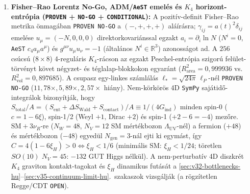 \documentclass[11pt,a4paper]{article}
\begin{document}
\begin{enumerate}
\item \textbf{Fisher--Rao Lorentz No-Go, ADM/\texttt{AeST} emelés és $K_4$ horizont-entrópia (\texttt{PROVEN} + \texttt{NO-GO} + \texttt{CONDITIONAL}):} A pozitív-definit Fisher--Rao metrika önmagában \texttt{PROVEN NO-GO} a $(-,+,+,+)$ aláírásra; $\gamma_{ij}=a(t)^2\delta_{ij}$ emelése $u_\mu=(-N,0,0,0)$ direktorkovariánssal egzakt $a_i=\partial_i\ln N$ ($N^i=0$, \texttt{AeST} $c_4 a_\mu a^\mu$) és $g^{\mu\nu}u_\mu u_\nu=-1$ (általános $N^i\in\mathbb{R}^3$) azonosságot ad. A $256$ csúcsú ($8\times 8$) 4-reguláris $K_4$-rácson az egzakt Peschel-entrópia szigorú felület-törvényt követ négyzet- és téglalap-blokkokon egyaránt ($R^2_{\mathrm{area}}=0{,}999936$ vs.\ $R^2_{\mathrm{vol}}=0{,}897685$). A csupasz egy-linkes számlálás $\ell_*=\sqrt{24\pi}\,\ell_P$-nél \texttt{PROVEN NO-GO} ($11{,}78\times, 5{,}89\times, 2{,}57\times$ hiány). Nem-körkörös 4D \texttt{SymPy} sajátidő-integrálok bizonyítják, hogy $S_{\mathrm{total}}/A = (S_{\mathrm{ent}}+\Delta S_{\mathrm{Wald}}+S_{\mathrm{contact}})/A \equiv 1/(4G_{\mathrm{ind}})$ minden spin-0 ($c=1-6\xi$), spin-1/2 (Weyl $+1$, Dirac $+2$) és spin-1 ($+2-6=-4$) mezőre. $\mathrm{SM}+3\nu_R$-re ($N_W=48$, $N_V=12$ SM mértékbozon $\Lambda_{\mathrm{UV}}$-nél) a fermion ($+48$) és mértékbozon ($-48$) egyedül $N_{\mathrm{gen}}=3$-nál ejti ki egymást, így $C=4(1-6\xi_H)>0 \iff \xi_H < 1/6$ (minimális SM: $\xi_H < 1/24$; töretlen $SO(10)$ $N_V=45$: $-132$ GUT Higgs nélkül). A nem-perturbatív 4D diszkrét $K_4$ graviton kontakt-tagokat és $\xi_H$ dinamikus futását a \ref{sec:v32-bottlenecks-hu}--\ref{sec:v35-continuum-limit-hu}.~szakaszok vizsgálják (a rögzítetlen Regge/CDT \texttt{OPEN}).
\end{enumerate}
\end{document}
